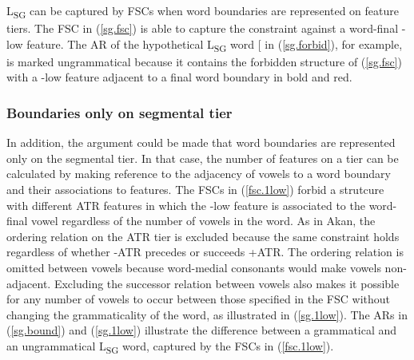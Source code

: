 \documentclass[,doc,floatsintext]{apa6}
\theoremstyle{definition}
\theoremstyle{definition}
\theoremstyle{definition}
\theoremstyle{remark}
\begin{document}
L\textsubscript{SG} can be captured by FSCs when word boundaries are
represented on feature tiers. The FSC in (\ref{sg.fsc}) is able to
capture the constraint against a word-final -low feature. The AR of the
hypothetical L\textsubscript{SG} word {[}\textipa{obIseI}{]} in
(\ref{sg.forbid}), for example, is marked ungrammatical because it
contains the forbidden structure of (\ref{sg.fsc}) with a -low feature
adjacent to a final word boundary in bold and red.

\subsubsection{Boundaries only on segmental
tier}\label{boundaries-only-on-segmental-tier}

In addition, the argument could be made that word boundaries are
represented only on the segmental tier. In that case, the number of
features on a tier can be calculated by making reference to the
adjacency of vowels to a word boundary and their associations to
features. The FSCs in (\ref{fsc.1low}) forbid a strutcure with different
ATR features in which the -low feature is associated to the word-final
vowel regardless of the number of vowels in the word. As in Akan, the
ordering relation on the ATR tier is excluded because the same
constraint holds regardless of whether -ATR precedes or succeeds +ATR.
The ordering relation is omitted between vowels because word-medial
consonants would make vowels non-adjacent. Excluding the successor
relation between vowels also makes it possible for any number of vowels
to occur between those specified in the FSC without changing the
grammaticality of the word, as illustrated in (\ref{sg.1low}). The ARs
in (\ref{sg.bound}) and (\ref{sg.1low}) illustrate the difference
between a grammatical and an ungrammatical L\textsubscript{SG} word,
captured by the FSCs in (\ref{fsc.1low}).
\end{document}
